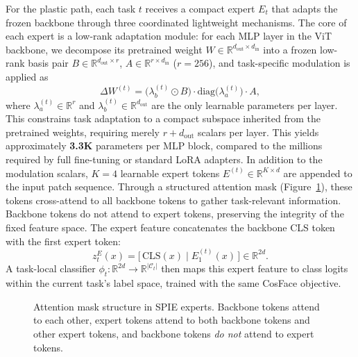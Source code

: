 For the plastic path, each task $t$ receives a compact expert $E_t$ that adapts the frozen backbone through three coordinated lightweight mechanisms. The core of each expert is a low-rank adaptation module: for each MLP layer in the ViT backbone, we decompose its pretrained weight $W \in \mathbb{R}^{d_{\text{out}} \times d_{\text{in}}}$ into a frozen low-rank basis pair $B \in \mathbb{R}^{d_{\text{out}} \times r}$, $A \in \mathbb{R}^{r \times d_{\text{in}}}$ ($r=256$), and task-specific modulation is applied as
\begin{equation}
\Delta W^{(t)} = \big( \lambda_b^{(t)} \odot B \big) \cdot \text{diag}\big(\lambda_a^{(t)}\big) \cdot A,
\label{eq:adapt}
\end{equation}
where $\lambda_a^{(t)} \in \mathbb{R}^{r}$ and $\lambda_b^{(t)} \in \mathbb{R}^{d_{\text{out}}}$ are the only learnable parameters per layer. This constrains task adaptation to a compact subspace inherited from the pretrained weights, requiring merely $r + d_{\text{out}}$ scalars per layer. This yields approximately \textbf{3.3K} parameters per MLP block, compared to the millions required by full fine-tuning or standard LoRA adapters. In addition to the modulation scalars, $K=4$ learnable expert tokens $E^{(t)} \in \mathbb{R}^{K \times d}$ are appended to the input patch sequence. Through a structured attention mask (Figure~\ref{fig:attn_mask}), these tokens cross-attend to all backbone tokens to gather task-relevant information. Backbone tokens do not attend to expert tokens, preserving the integrity of the fixed feature space. The expert feature concatenates the backbone CLS token with the first expert token:
\begin{equation}
z_t^E(x) = \big[\, \text{CLS}(x) \;\big|\; E^{(t)}_1(x) \,\big] \in \mathbb{R}^{2d}.
\label{eq:expert_feat}
\end{equation}
A task-local classifier $\phi_t: \mathbb{R}^{2d} \rightarrow \mathbb{R}^{|\mathcal{C}_t|}$ then maps this expert feature to class logits within the current task's label space, trained with the same CosFace objective.

\begin{figure}[t]
\centering
\caption{Attention mask structure in SPIE experts. Backbone tokens attend to each other, expert tokens attend to both backbone tokens and other expert tokens, and backbone tokens \emph{do not} attend to expert tokens.}
\label{fig:attn_mask}
\end{figure}

